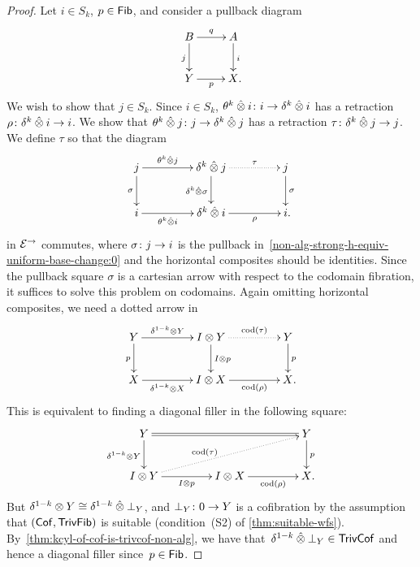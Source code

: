 \documentclass[reqno,10pt,a4paper,oneside,draft]{amsart}
\begin{document}
{{\begin{proof} Let  $i  \in S_k$, $p \in \Fib$, and consider a pullback diagram
\begin{equation} \label{non-alg-strong-h-equiv-uniform-base-change:0}
\begin{gathered}
\xymatrix{
 B \ar[d]_j \ar[r]^q & A \ar[d]^i \\
Y \ar[r]_p & X \rlap{.}}
\end{gathered}
\end{equation}
We wish to show that $j \in  S_k$.
Since $i \in S_k$, $\thetak \hatotimes i \co i \to \kcyl \hatotimes i$ has a retraction $\rho \co \kcyl \hatotimes i \to i$.
We show that $\thetak \hatotimes j \co j \to \kcyl \hatotimes j$ has a retraction $\tau \co  \kcyl \hatotimes j \to j$.
We define  $\tau$ so that the diagram 
\[
\xymatrix@C+2em{
j
  \ar[r]^-{\thetak \hatotimes j}
  \ar[d]_{\sigma}
&
  \kcyl \hatotimes j
  \ar@{.>}[r]^-{\tau}
  \ar[d]_{\kcyl \hatotimes \sigma}
&
 j
  \ar[d]^{\sigma}
\\
  i
  \ar[r]_-{\thetak \hatotimes i}
&
  \kcyl \hatotimes i
  \ar[r]_-{\rho}
&
  i
\rlap{.}}
\]
in $\cal{E}^\to$ commutes, where $\sigma \co j \to i$ is the pullback in~\eqref{non-alg-strong-h-equiv-uniform-base-change:0} and the horizontal composites should be identities.  Since the pullback square $\sigma$ is a cartesian arrow with respect to the codomain fibration, it suffices to solve this problem on codomains. Again omitting horizontal composites, we need a dotted arrow in
\[
\xymatrix@C+2em{
  Y
  \ar[r]^-{\kcylinv \otimes Y}
  \ar[d]_{p}
&
  \interval \otimes Y
  \ar@{.>}[r]^-{\cod(\tau)}
  \ar[d]^{\interval \otimes p}
&
  Y
  \ar[d]^{p}
\\
  X
  \ar[r]_-{\kcylinv \otimes X}
&
  \interval \otimes X
  \ar[r]_-{\cod(\rho)}
&
  X
\rlap{.}}
\]
This is equivalent to finding a diagonal filler in the following square:
\[
\xymatrix@C+2em{
  Y
  \ar@{=}[rr]
  \ar[d]_{\kcylinv \otimes Y}
&&
  Y
  \ar[d]^{p}
\\
  \interval \otimes Y
  \ar[r]_-{I \otimes p}
  \ar@{.>}[urr]^(0.4){\cod(\tau)}
&
  \interval \otimes X
  \ar[r]_-{\cod(\rho)}
&
  X
\rlap{.}}
\]
But $\kcylinv \otimes Y \iso \kcylinv \hatotimes \bot_Y$, and $\bot_Y \co 0 \to Y$ is a cofibration by the assumption that $(\Cof, \TrivFib)$ is suitable (condition~(S2) of \cref{thm:suitable-wfs}).
By~\cref{thm:kcyl-of-cof-is-trivcof-non-alg}, we have that~$\kcylinv \hatotimes \bot_Y \in \TrivCof$ and hence a diagonal filler since~$p \in \Fib$.
\end{proof}

}}
\end{document}
